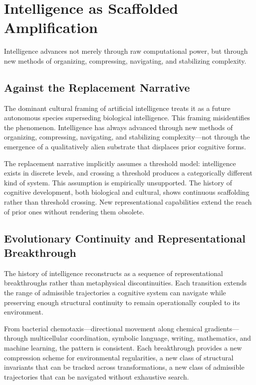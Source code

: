 \chapter{Intelligence as Scaffolded Amplification}
\label{ch:scaffolded}

\epigraph{Intelligence advances not merely through raw computational power, but through
new methods of organizing, compressing, navigating, and stabilizing complexity.}{}

\section{Against the Replacement Narrative}

The dominant cultural framing of artificial intelligence treats it as a future autonomous
species superseding biological intelligence. This framing misidentifies the phenomenon.
Intelligence has always advanced through new methods of organizing, compressing,
navigating, and stabilizing complexity---not through the emergence of a qualitatively
alien substrate that displaces prior cognitive forms.

The replacement narrative implicitly assumes a threshold model: intelligence exists in
discrete levels, and crossing a threshold produces a categorically different kind of
system. This assumption is empirically unsupported. The history of cognitive development,
both biological and cultural, shows continuous scaffolding rather than threshold crossing.
New representational capabilities extend the reach of prior ones without rendering
them obsolete.

\section{Evolutionary Continuity and Representational Breakthrough}

The history of intelligence reconstructs as a sequence of representational breakthroughs
rather than metaphysical discontinuities. Each transition extends the range of admissible
trajectories a cognitive system can navigate while preserving enough structural continuity
to remain operationally coupled to its environment.

From bacterial chemotaxis---directional movement along chemical gradients---through
multicellular coordination, symbolic language, writing, mathematics, and machine
learning, the pattern is consistent. Each breakthrough provides a new compression scheme
for environmental regularities, a new class of structural invariants that can be tracked
across transformations, a new class of admissible trajectories that can be navigated
without exhaustive search.

